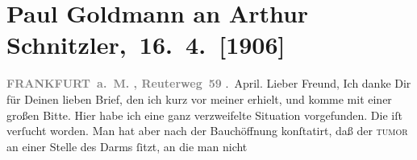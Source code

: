 

         
         \renewcommand{\erwaehntePersonen}{Personen: Paul Goldmann, Paul Kraske, Fedor Mamroth, Josef Rosengart, Julius Schnitzler}
         \renewcommand{\erwaehnteOrte}{Orte: Berlin, Frankfurt am Main, Freiburg im Breisgau, Reuterweg, Wien}
         \renewcommand{\erwaehnteWerke}{}
               \section[ Paul Goldmann an Arthur Schnitzler, 16. 4. {[}1906{]}]{ Paul Goldmann an Arthur Schnitzler, 16. 4. {[}1906{]}}\nopagebreak{}\rehead{ }\begin{ledgroupsized}[t]{13cm}\normalsize\beginnumbering \toendnotes[C]{\smallbreak\pagebreak[2]} 
\toendnotes[C]{\smallbreak}\pstart
           \noindent{}\raggedleft{}{\pb}\textcolor{gray}{\textbf{FRANKFURT a. M. , Reuterweg 59}}\pend
           . April.\pend
           \pstart
           Lieber Freund, Ich danke Dir für Deinen lieben Brief,
               den ich kurz vor meiner \label{K_L03243-1v}\label{K_L03243-1h} erhielt, und komme mit einer großen Bitte.\pend
           \pstart
           Hier habe ich eine ganz
               verzweifelte Situation vorgefunden. Die \label{K_L03243-2v}\label{K_L03243-2h} iſt verſucht worden. Man hat aber nach der Bauchöffnung konſtatirt, daß der
                  \textsc{tumor} an einer Stelle des Darms ſitzt, an die man nicht

\end{ledgroupsized}
